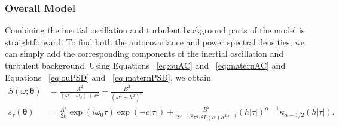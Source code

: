\documentclass{stat572Style}
\begin{document}
\subsubsection{Overall Model}
Combining the inertial oscillation and turbulent background parts of the model is straightforward. To find both the autocovariance and power spectral densities, we can simply add the corresponding components of the inertial oscillation and turbulent background. Using Equations ~\ref{eq:ouAC} and ~\ref{eq:maternAC} and Equations ~\ref{eq:ouPSD} and ~\ref{eq:maternPSD}, we obtain
\begin{align}
S(\omega; \boldsymbol{\theta}) &= \frac{A^{2}}{(\omega - \omega_{0}) + c^{2}} + \frac{B^{2}}{(\omega^{2} + h^{2})^{\alpha}}\\
s_{\tau}(\boldsymbol{\theta}) &= \frac{A^{2}}{2c} \exp(i \omega_{0}\tau) \exp(-c|\tau|) +  \frac{B^{2}}{2^{\alpha - 1/2}\pi^{1/2} \Gamma(\alpha) h^{2 \alpha - 1}}(h|\tau|)^{\alpha - 1}\kappa_{\alpha - 1/2}(h|\tau|).
\end{align}
\end{document}
